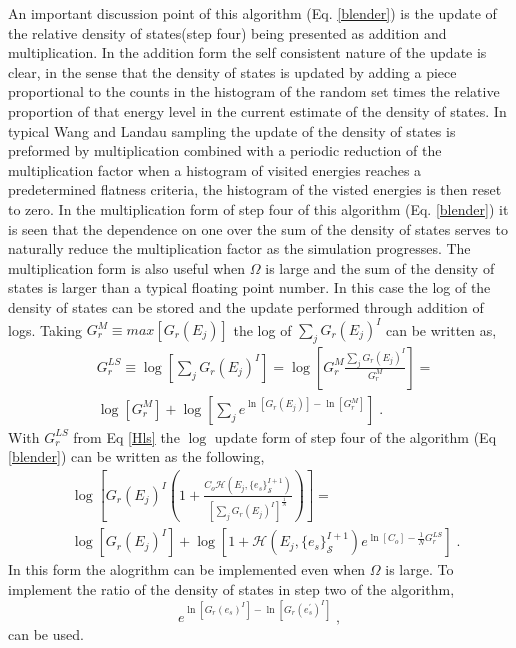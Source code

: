 \documentclass[aps,pre,reprint,superscriptaddress,showkeys]{revtex4-1}
\begin{document}
An important discussion point of this algorithm (Eq. \ref{blender}) is the update of the relative density of states(step four) being presented as addition and multiplication. In the addition form the self consistent nature of the update is clear, in the sense that the  density of states is updated by adding a  piece proportional to the counts in the histogram of the random set times the relative proportion of  that energy level in the current estimate of the density of states.  In  typical Wang and Landau sampling the update of the density of states is preformed by multiplication combined with a periodic reduction of the multiplication factor when a histogram of visited energies reaches a predetermined flatness criteria, the histogram of the visted energies is then reset to zero. In the multiplication form of step four of this algorithm (Eq. \ref{blender}) it is seen that the dependence on one over the sum of the density of states serves to naturally reduce the multiplication factor as the simulation progresses. The multiplication form is also useful when $\Omega$ is large and the sum of the density of states is larger than a typical floating point number. In this case the log of the density of states can be stored and the update performed through addition of logs. Taking $G_{r}^M \equiv  max[G_{r}(E_j)]$ the log of $\sum_j G_r(E_j)^{I}$ can be written as, 
\begin{equation}
\begin{split}
&G_{r}^{LS} \equiv \log[\sum_j G_{r}(E_j)^{I}] = \log[G_{r}^M \frac{\sum_j G_{r}(E_j)^{I}}{G_{r}^M}]=\\
&\log[G_{r}^M] + \log[\sum_j e^{\ln[G_{r}(E_j)] - \ln[G_{r}^M]} ] \;.
\end{split}
\label{Hls}
\end{equation} 
With $G_r^{LS}$ from Eq \ref{Hls} the $\log$ update form of step four of the algorithm (Eq \ref{blender}) can be written as the following, 
\begin{equation}
\begin{split}
& \log[ G_{r}(E_j)^{I}( 1 +  \frac{C_o \mathcal{H}(E_j,\{e_s\}_{\mathcal{S}}^{I+1}) }{ [\sum_j G_{r}(E_j)^{I}]^{\frac{1}{N} } } ) ]=\\
& \log[ G_{r}(E_j)^{I} ] + \log[1 +   \mathcal{H}(E_j,\{e_s\}_{\mathcal{S}}^{I+1})e^{\ln[C_o]-\frac{1}{N}G_{r}^{LS}}] \;.
\end{split}
\end{equation}
In this form  the alogrithm can be implemented even when $\Omega$ is large. To implement the ratio of the density of states in step two of the algorithm, 
\begin{equation}
e^{\ln[G_{r}(e_s)^{I}] - \ln[G_{r}(e_s^{'})^{I}]} \;,
\end{equation}
can be used.
\end{document}
